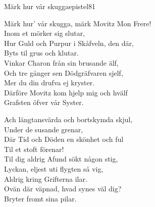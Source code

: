 \begin{song}{Märk hur vår skugga}{epistel81}
\begin{vers}
Märk hur' vår skugga, märk Movitz Mon Frere!\\
Inom et mörker sig slutar,\\
Hur Guld och Purpur i Skåfveln, den där,\\
Byts til grus och klutar.\\
Vinkar Charon från sin brusande älf,\\
Och tre gånger sen Dödgräfvaren sjelf,\\
Mer du din drufva ej kryster.\\
Därföre Movitz kom hjelp mig och hvälf\\
Grafsten öfver vår Syster.\\
\end{vers}
\begin{vers}
Ach längtansvärda och bortskymda skjul,\\
Under de susande grenar,\\
Där Tid och Döden en skönhet och ful\\
Til et stoft förenar!\\
Til dig aldrig Afund sökt någon stig,\\
Lyckan, eljest uti flygten så vig,\\
Aldrig kring Grifterna ilar.\\
Ovän där väpnad, hvad synes väl dig?\\
Bryter fromt sina pilar.\\
\end{vers}

\newp


\end{song}
